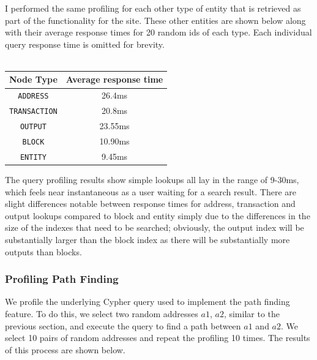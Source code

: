 I performed the same profiling for each other type of entity that is retrieved as part of the functionality for the site. These other entities are shown below along with their average response times for 20 random ids of each type. Each individual query response time is omitted for brevity. 
\\\\
\begin{center}
\begin{tabular}{ |c|c| } 
 \hline
\textbf{Node Type} & \textbf{Average response time} \\\hline
\texttt{ADDRESS} & 26.4ms \\
\texttt{TRANSACTION} & 20.8ms \\
\texttt{OUTPUT} & 23.55ms \\
\texttt{BLOCK} & 10.90ms \\
\texttt{ENTITY} & 9.45ms \\
\hline
\end{tabular}
\end{center}
The query profiling results show simple lookups all lay in the range of 9-30ms, which feels near instantaneous as a user waiting for a search result. There are slight differences notable between response times for address, transaction and output lookups compared to block and entity simply due to the differences in the size of the indexes that need to be searched; obviously, the output index will be substantially larger than the block index as there will be substantially more outputs than blocks. 

\subsubsection{Profiling Path Finding}\label{evaluation:path-finding-profile}
We profile the underlying Cypher query used to implement the path finding feature. To do this, we select two random addresses $a1$, $a2$, similar to the previous section, and execute the query to find a path between $a1$ and $a2$. We select 10 pairs of random addresses and repeat the profiling 10 times. The results of this process are shown below. 

